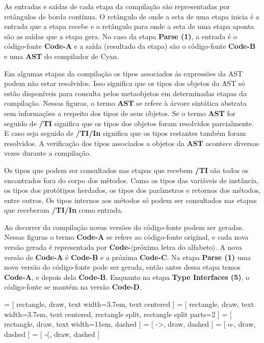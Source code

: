 As entradas e saídas de cada etapa da compilação são representadas por retângulos de borda contínua. O retângulo de onde a seta de uma etapa inicia é a entrada que a etapa recebe e o retângulo para onde a seta de uma etapa aponta são as saídas que a etapa gera. No caso da etapa \textbf{Parse (1)}, a entrada é o código-fonte \textbf{Code-A} e a saída (resultado da etapa) são o código-fonte \textbf{Code-B} e uma \textbf{AST} do compilador de Cyan.

Em algumas etapas da compilação os tipos associados às expressões da AST podem não estar resolvidos. Isso significa que os tipos dos objetos da AST só estão disponíveis para consulta pelos metaobjetos em determinadas etapas da compilação. Nessas figuras, o termo \textbf{AST} se refere à árvore sintática abstrata sem informações a respeito dos tipos de seus objetos. Se o termo \textbf{AST} for seguido de \textbf{/TI} significa que os tipos dos objetos foram resolvidos parcialmente. E caso seja seguido de \textbf{/TI/In} significa que os tipos restantes também foram resolvidos. A verificação dos tipos associados a objetos da \textbf{AST} acontece diversas vezes durante a compilação.

Os tipos que podem ser consultados nas etapas que recebem \textbf{/TI} são todos os encontrados fora do corpo dos métodos. Como os tipos das variáveis de instância, os tipos dos protótipos herdados, os tipos dos parâmetros e retornos dos métodos, entre outros. Os tipos internos aos métodos só podem ser consultados nas etapas que receberam \textbf{/TI/In} como entrada.

Ao decorrer da compilação novas versões do código-fonte podem ser geradas. Nessas figuras o termo \textbf{Code-A} se refere ao código-fonte original, e cada nova versão gerada é representada por \textbf{Code-}$\langle$próxima letra do alfabeto$\rangle$. A nova versão de \textbf{Code-A} é \textbf{Code-B} e a próxima \textbf{Code-C}. Na etapa \textbf{Parse (1)} uma nova versão do código-fonte pode ser gerada, então antes dessa etapa temos \textbf{Code-A}, e depois dela \textbf{Code-B}. Enquanto na etapa \textbf{Type Interfaces (5)}, o código-fonte se mantém na versão \textbf{Code-D}.

 = [ rectangle, draw, text width=3.7em, text centered ]
 = [ rectangle, draw, text width=3.7em, text centered, rectangle split, rectangle split parts=2 ]
 = [ rectangle, draw, text width=11em, dashed ]
 = [ ->, draw, dashed ]
 = [ o-, draw, dashed ]
 = [ -(, draw, dashed ]

